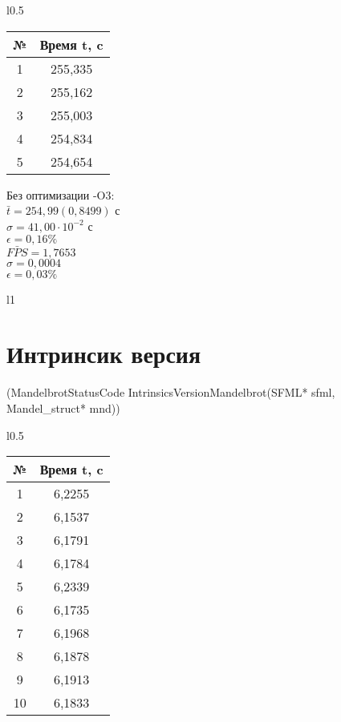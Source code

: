 \documentclass[12pt, letterpaper]{article}
\begin{document}
    \begin{wraptable}{l}{0.5\textwidth}
        \begin{tabular}{cc} 
        \toprule             %
        \textbf{№} & \textbf{Время t, c} \\
        \midrule             %
        1 & 255,335 \\
        2 & 255,162 \\
        3 & 255,003 \\
        4 & 254,834 \\
        5 & 254,654 \\
        \bottomrule          %
        \end{tabular}
    \end{wraptable}
    Без оптимизации -O3:\\   
    $\bar{t} = 254,99 (0,8499)$ с\\
    $\sigma = 41,00 \cdot 10^{-2}$ с\\
    $\epsilon = 0,16\%$\\
    $\bar{FPS} = 1,7653$\\
    $\sigma = 0,0004$\\
    $\epsilon = 0,03\%$\\

    \begin{wraptable}{l}{1\textwidth} 
    \section{Интринсик версия} (MandelbrotStatusCode IntrinsicsVersionMandelbrot(SFML* sfml, Mandel\_struct* mnd))
    \end{wraptable}
    
    \begin{wraptable}{l}{0.5\textwidth}
        \begin{tabular}{cc} 
        \toprule             %
        \textbf{№} & \textbf{Время t, c} \\
        \midrule             %
        1 & 6,2255 \\
        2 & 6,1537 \\
        3 & 6,1791 \\
        4 & 6,1784 \\
        5 & 6,2339 \\
        6 & 6,1735 \\
        7 & 6,1968 \\
        8 & 6,1878 \\
        9 & 6,1913 \\
        10 & 6,1833 \\
        \bottomrule          %
        \end{tabular}
    \end{wraptable}
    
\end{document}
